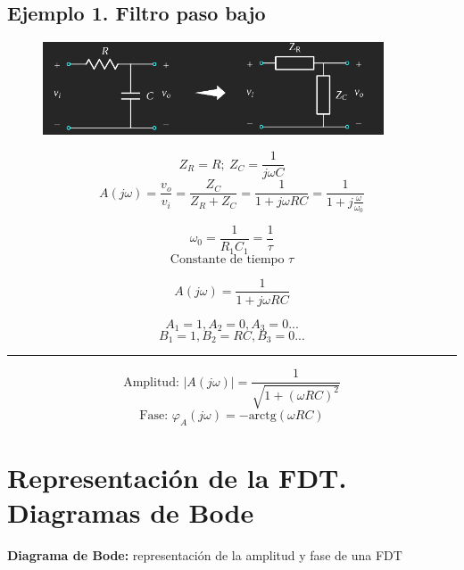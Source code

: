\documentclass{article}
\begin{document}
\subsection{Ejemplo 1. Filtro paso bajo}

\begin{figure}[h!]
    \centering
    \includegraphics[width=0.9\textwidth]{fig2.jpg} 
\end{figure}
\begin{minipage}{0.5\textwidth}
$$
Z_{R} = R ; \ Z_{C} = \frac{1}{j \omega C}
$$
\[ A(j\omega) = \frac{v_o}{v_i} = \frac{Z_C}{Z_R + Z_C} = \frac{1}{1 + j \omega RC} = \frac{1}{1 + j \frac{\omega}{\omega_0}} \]
\end{minipage}%
\begin{minipage}{0.4\textwidth}
$$
\omega_0 = \frac{1}{R_{1}C_{1}} = \frac{1}{\tau} 
$$
$$
\text{Constante de tiempo } \tau
$$
\end{minipage}


\newpage
\begin{minipage}{0.5\textwidth}
$$
A (j \omega) = \frac{1}{1 + j \omega RC}
$$
\end{minipage}
\begin{minipage}{0.5\textwidth}
    $$
A_{1} = 1, A_{2} = 0, A_{3} = 0 ...
    $$
    $$
B_{1} = 1, B_{2} = RC, B_{3} = 0 ...
    $$
\end{minipage}
\smallskip
\hrule
\smallskip
$$
\text{Amplitud: } |A (j \omega)| = \frac{1}{\sqrt{1 + (\omega RC)^2}}
$$
$$
\text{Fase: } \varphi_A (j \omega) = - \text{arctg}(\omega RC) 
$$

\section{Representación de la FDT. Diagramas de Bode}
\textbf{Diagrama de Bode: }representación de la amplitud y fase de una FDT
\bigskip
\end{document}
